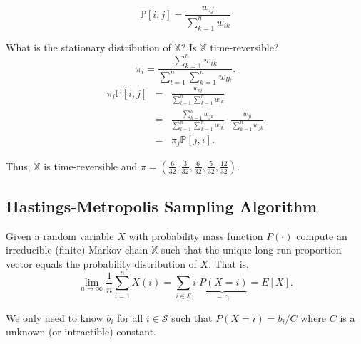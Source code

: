 \begin{question}
\begin{figure}[htp]
\centering
{}
\[ \mathbb{P}[i, j] = \frac{w_{ij}}{\sum_{k = 1}^{n} w_{ik}} \]
\end{figure}

What is the stationary distribution of $ \mathbb{X} $? Is $ \mathbb{X} $ time-reversible?
\[ \pi_{i} = \frac{\sum_{k = 1}^{n} w_{ik}}{\sum_{l = 1}^{n} \sum_{k = 1}^{n} w_{lk}}. \]
\begin{eqnarray*}
\pi_{i} \mathbb{P}[i, j]
  & = & \frac{w_{ij}}{\sum_{l = 1}^{n} \sum_{k = 1}^{n} w_{lk}} \\
  & = & \frac{\sum_{k = 1}^{n} w_{jk}}{\sum_{l = 1}^{n} \sum_{k = 1}^{n} w_{lk}} \cdot \frac{w_{ji}}{\sum_{k = 1}^{n} w_{jk}} \\
  & = & \pi_{j} \mathbb{P}[j, i].
\end{eqnarray*}

Thus, $ \mathbb{X} $ is time-reversible and $ \pi = (\frac{6}{32}, \frac{3}{32}, \frac{6}{32}, \frac{5}{32}, \frac{12}{32}) $.
\end{question}

\subsection{Hastings-Metropolis Sampling Algorithm}
Given a random variable $ X $ with probability mass function $ P(\cdot) $ compute an irreducible (finite) Markov chain $ \mathbb{X} $ such that the unique long-run proportion vector equals the probability distribution of $ X $. That is,
\[ \lim_{n \to \infty} \frac{1}{n} \sum_{i = 1}^{n} X(i) = \sum_{i \in \mathcal{S}} i \underbrace{\cdot P(X = i)}_{= r_{i}} = E[X]. \]

We only need to know $ b_{i} $ for all $ i \in \mathcal{S} $ such that $ P(X = i) = b_{i} / C $ where $ C $ is a unknown (or intractible) constant.

